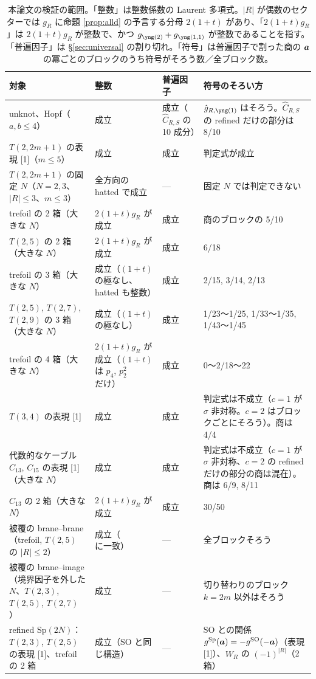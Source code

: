 \begin{table}[t]
\centering
\small
\caption{本論文の検証の範囲。「整数」は整数係数の Laurent 多項式。$|R|$ が偶数のセクターでは $g_R$ に命題 \ref{prop:alld} の予言する分母 $2(1+t)$ があり、「$2(1+t)g_R$」は $2(1+t)g_R$ が整数で、かつ $g_{\ytwo} + g_{\yoneone}$ が整数であることを指す。「普遍因子」は §\ref{sec:universal} の割り切れ。「符号」は普遍因子で割った商の $\bm{a}$ の冪ごとのブロックのうち符号がそろう数／全ブロック数。}\label{tab:summary}
\begin{tabular}{p{3.8cm}p{2.5cm}p{2.3cm}p{5.4cm}}
\toprule
対象 & 整数 & 普遍因子 & 符号のそろい方 \\
\midrule
unknot、Hopf（$a, b \le 4$） & 成立 & 成立（$\hat C_{R,S}$ の 10 成分） & $\hat g_{R,\yone}$ はそろう。$\hat C_{R,S}$ の refined だけの部分は 8/10 \\
$T(2,2m+1)$ の表現 [1]（$m \le 5$） & 成立 & 成立 & 判定式が成立 \\
$T(2,2m+1)$ の固定 $N$（$N = 2, 3$、$|R| \le 3$、$m \le 3$） & 全方向の hatted で成立 & — & 固定 $N$ では判定できない \\
trefoil の 2 箱（大きな $N$） & $2(1+t)g_R$ が成立 & 成立 & 商のブロックの 5/10 \\
$T(2,5)$ の 2 箱（大きな $N$） & $2(1+t)g_R$ が成立 & 成立 & 6/18 \\
trefoil の 3 箱（大きな $N$） & 成立（$(1+t)$ の極なし、hatted も整数） & 成立 & 2/15, 3/14, 2/13 \\
$T(2,5)$, $T(2,7)$, $T(2,9)$ の 3 箱（大きな $N$） & 成立（$(1+t)$ の極なし） & 成立 & 1/23〜1/25, 1/33〜1/35, 1/43〜1/45 \\
trefoil の 4 箱（大きな $N$） & $2(1+t)g_R$ が成立（$(1+t)$ は $p_4$, $p_2^2$ だけ） & 成立 & 0〜2/18〜22 \\
$T(3,4)$ の表現 [1] & 成立 & 成立 & 判定式は不成立（$c = 1$ が $\sigma$ 非対称。$c = 2$ はブロックごとにそろう）。商は 4/4 \\
代数的なケーブル $C_{13}$, $C_{15}$ の表現 [1]（大きな $N$） & 成立 & 成立 & 判定式は不成立（$c = 1$ が $\sigma$ 非対称、$c = 2$ の refined だけの部分の商は混在）。商は 6/9, 8/11 \\
$C_{13}$ の 2 箱（大きな $N$） & $2(1+t)g_R$ が成立 & 成立 & 30/50 \\
被覆の brane--brane（trefoil, $T(2,5)$ の $|R| \le 2$） & 成立（\cite{KN17} に一致） & — & 全ブロックそろう \\
被覆の brane--image（境界因子を外した $N$、$T(2,3)$, $T(2,5)$, $T(2,7)$） & 成立 & — & 切り替わりのブロック $k = 2m$ 以外はそろう \\
refined Sp$(2N)$：$T(2,3)$, $T(2,5)$ の表現 [1]、trefoil の 2 箱 & 成立（SO と同じ構造） & — & SO との関係 $g^{\mathrm{Sp}}(\bm{a}) = -g^{\mathrm{SO}}(-\bm{a})$（表現 [1]）、$W_R$ の $(-1)^{|R|}$（2 箱） \\
\bottomrule
\end{tabular}
\end{table}

